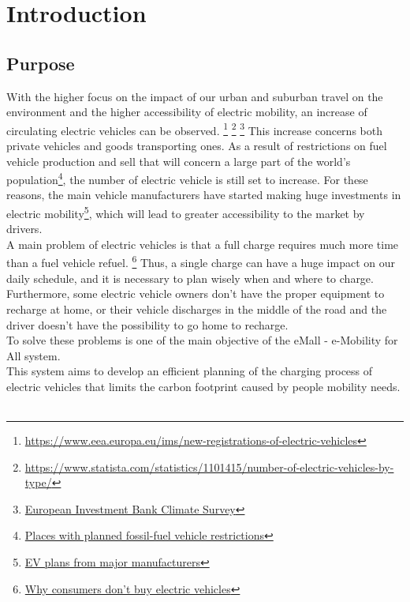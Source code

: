 \section{Introduction}\label{intro}
\subsection{Purpose}
With the higher focus on the impact of our urban and suburban travel on the environment and the higher accessibility of electric mobility, an increase of circulating electric vehicles can be observed.
\footnote{\url{https://www.eea.europa.eu/ims/new-registrations-of-electric-vehicles}} \footnote{\url{https://www.statista.com/statistics/1101415/number-of-electric-vehicles-by-type/}} \footnote{\href{https://www.eib.org/en/surveys/climate-survey/4th-climate-survey/hybrid-electric-petrol-cars-flying-holidays-climate.htm}{European Investment Bank Climate Survey}}
This increase concerns both private vehicles and goods transporting ones.
As a result of restrictions on fuel vehicle production and sell that will concern a large part of the world's population\footnote{\href{https://en.wikipedia.org/wiki/Phase-out\_of\_fossil\_fuel\_vehicles\#Places\_with\_planned\_fossil-fuel\_vehicle\_restrictions}{Places with planned fossil-fuel vehicle restrictions}}, the number of
electric vehicle is still set to increase. For these reasons, the main vehicle manufacturers have started making huge investments in electric mobility\footnote{\href{https://en.wikipedia.org/wiki/Electric\_car\#EV\_plans\_from\_major\_manufacturers}{EV plans from major manufacturers}}, which will lead to greater accessibility to the market by drivers.\\

A main problem of electric vehicles is that a full charge requires much more time than a fuel vehicle refuel.
\footnote{\href{https://blinkcharging.com/fact-from-fiction-the-real-reason-why-consumers-dont-buy-electric-vehicles/?locale=en}{Why consumers don't buy electric vehicles}}
Thus, a single charge can have a huge impact on our daily schedule, and it is necessary to plan wisely when and where to charge.
Furthermore, some electric vehicle owners don't have the proper equipment to recharge at home, or their vehicle discharges in the middle of the road and the driver doesn't have the possibility to go home to recharge.\\
To solve these problems is one of the main objective of the eMall - e-Mobility for All system.\\
This system aims to develop an efficient planning of the charging process of electric vehicles that limits the carbon footprint caused by people mobility needs.\\\\

